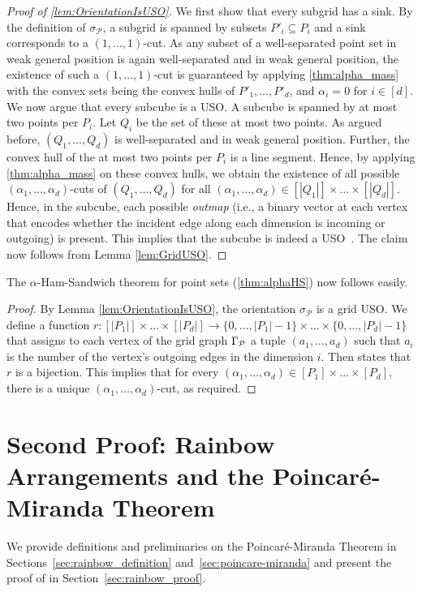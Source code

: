 \documentclass[11pt]{article}
\newcommand{\f}[1]{\relax\ifmmode#1\else{$#1$}\fi}
\newcommand{\Grid}{\f{\Gamma}\xspace}
\begin{document}
%
\begin{proof}[Proof of \cref{lem:OrientationIsUSO}]
We first show that every subgrid has a sink. 
By the definition of $\sigma_{\mathcal{P}}$, a subgrid is spanned by subsets $P'_i\subseteq P_i$ and a sink corresponds to a $(1,\dots,1)$-cut. 
%
As any subset of a well-separated point set in weak general position is again well-separated and in weak general position, the existence of such a $(1,\dots,1)$-cut is guaranteed by applying \cref{thm:alpha_mass} with the convex sets being the convex hulls of $P'_1, \dots, P'_d$, and $\alpha_i = 0$ for $i \in [d]$.
%
We now argue that every subcube is a USO. 
A subcube is spanned by at most two points per $P_i$. 
Let $Q_i$ be the set of these at most two points.
As argued before, $(Q_1, \dots, Q_d)$ is well-separated and in weak general position.
Further, the convex hull of the at most two points per $P_i$ is a line segment.
Hence, by applying \cref{thm:alpha_mass} on these convex hulls, we obtain the existence of all possible $(\alpha_1, \dots, \alpha_d)$-cuts of $(Q_1, \dots, Q_d)$ for all $(\alpha_1, \dots, \alpha_d) \in [|Q_1|] \times \dots \times [|Q_d|]$.
Hence, in the subcube, each possible \emph{outmap} (i.e., a binary vector at each vertex that encodes whether the incident edge along each dimension is incoming or outgoing) is present.
This implies that the subcube is indeed a USO~\cite{szabo2001usos}.
%
The claim now follows from Lemma \ref{lem:GridUSO}.
\end{proof}
%
The $\alpha$-Ham-Sandwich theorem for point sets (\cref{thm:alphaHS}) now follows easily.
%
\alphaHS*
%
\begin{proof}
By Lemma \ref{lem:OrientationIsUSO}, the orientation $\sigma_{\mathcal{P}}$ is a grid USO. 
We define a function $r : [|P_1|] \times \dots \times [|P_d|] \to \{0, \dots, |P_1|-1\} \times \dots \times \{0, \dots, |P_d|-1\}$ that assigns to each vertex of the grid graph $\Grid_{\mathcal{P}}$ a tuple $(a_1, \dots, a_d)$ such that $a_i$ is the number of the vertex's outgoing edges in the dimension $i$.
Then \cite[Theorem 2.14]{gaertner2008grids} states that $r$ is a bijection.
This implies that for every $(\alpha_1,\ldots,\alpha_d) \in [P_1] \times \dots \times [P_d]$, there is a unique $(\alpha_1,\ldots,\alpha_d)$-cut, as required.
\end{proof}
%
\section{Second Proof: Rainbow Arrangements and the Poincar\'{e}-Miranda Theorem}
\label{sec:rainbow}
%
We provide definitions and preliminaries on the Poincar\'{e}-Miranda Theorem in Sections~\ref{sec:rainbow_definition} and~\ref{sec:poincare-miranda} and present the proof of  in Section~\ref{sec:rainbow_proof}.
%
\end{document}
